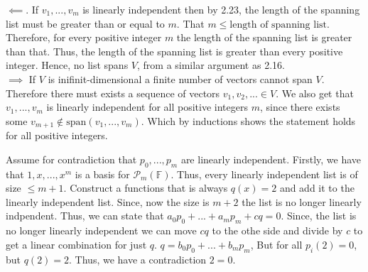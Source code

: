 \documentclass[10pt, twocolumn]{article}
\newcommand{\vspan}{\text{span}}
\begin{document}
\begin{q}[Problem 14]
    $ \impliedby $. If $ v_1, ..., v_m $ is linearly independent then by 2.23, the length of the spanning list must be greater than or equal to $ m $. 
    That $ m \leq \text{length of spanning list} $. 
    Therefore, for every positive integer $ m $ the length of the spanning list is greater than that. 
    Thus, the length of the spanning list is greater than every positive integer. Hence, no list spans $ V $, from a similar argument as 2.16. \\
    $ \implies $ If $ V $ is inifinit-dimensional a finite number of vectors cannot span $ V $. Therefore there must exists a sequence of vectors $ v_1, v_2, ... \in V $. 
    We also get that $ v_1, ..., v_m $ is linearly independent for all positive integers $m $, since there exists some $ v_{m+1}  \not \in \vspan(v_1, ..., v_m )$. Which by inductions shows the statement holds for all positive integers.
\end{q}
\begin{q}[Problem 17]
    Assume for contradiction that $ p_0, ..., p_m $ are linearly independent. 
    Firstly, we have that $ 1, x, ..., x^m  $ is a basis for $ \mathcal{P}_m(\mathbb{F})$. 
    Thus, every linearly independent list is of size $ \leq m + 1 $. 
    Construct a functions that is always $ q(x) = 2 $ and add it to the linearly independent list. 
    Since, now the size is $ m + 2 $ the list is no longer linearly indpendent. 
    Thus, we can state that $ a_0 p_0 + ... + a_m p_m + c q = 0 $. 
    Since, the list is no longer linearly independent we can move $ cq $ to the othe side and divide by $ c $ to get a linear combination for just $ q $. 
    $ q = b_0 p_0 + ... + b_m p_m $, But for all $ p_i(2)  = 0 $, but $ q(2) = 2 $. Thus, we have a contradiction $ 2 = 0 $. 
\end{q}
\end{document}
